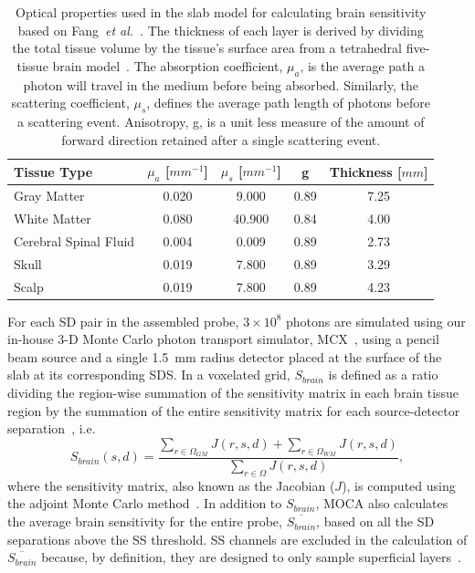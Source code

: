 \begin{table}
\centering
\caption{Optical properties used in the slab model for calculating brain sensitivity based on Fang~\emph{et al.}~\cite{Fang2010}. The thickness of each layer is derived by dividing the total tissue volume by the tissue's surface area from a tetrahedral five-tissue brain model~\cite{Sanchez2012}. The absorption coefficient, $\mu_{a}$, is the average path a photon will travel in the medium before being absorbed. Similarly, the scattering coefficient, $\mu_{s}$, defines the average path length of photons before a scattering event. Anisotropy, g, is a unit less measure of the amount of forward direction retained after a single scattering event.}
\label{tab:opticalproperties}
\begin{tabular}{@{}lcccc@{}}
\toprule
Tissue Type  & $\mu_{a}$ [$mm^{-1}$] & $\mu_{s}$ [$mm^{-1}$] & g    & Thickness [$mm$] \\ \midrule
Gray Matter                     & 0.020      & 9.000      & 0.89 & 7.25           \\
White Matter                    & 0.080      & 40.900     & 0.84 & 4.00           \\
Cerebral Spinal Fluid           & 0.004      & 0.009      & 0.89 & 2.73           \\
Skull                           & 0.019      & 7.800      & 0.89 & 3.29           \\
Scalp                           & 0.019      & 7.800      & 0.89 & 4.23           \\ \bottomrule
\end{tabular}
\end{table}

For each \ac{SD} pair in the assembled probe, $3\times10^{8}$ photons are simulated using our in-house 3-D Monte Carlo photon transport simulator, \ac{MCX}~\cite{Fang2009}, using a pencil beam source and a single 1.5~mm radius detector placed at the surface of the slab at its corresponding \ac{SDS}. In a voxelated grid, $S_{brain}$ is defined as a ratio dividing the region-wise summation of the sensitivity matrix in each brain tissue region by the summation of the entire sensitivity matrix for each source-detector separation~\cite{Brigadoi2015}, i.e.
\begin{equation}
\label{eq:fov}
S_{brain}(s,d) = \frac{\sum_{r\in\Omega_{GM}}J(r,s,d) + \sum_{r\in\Omega_{WM}}J(r,s,d)} {\sum_{r\in\Omega}J(r,s,d)},
\end{equation}
where the sensitivity matrix, also known as the Jacobian ($J$), is computed using the adjoint Monte Carlo method~\cite{Yao2018}. In addition to $S_{brain}$, \ac{MOCA} also calculates the average brain sensitivity for the entire probe, $\overline{S_{brain}}$, based on all the \ac{SD} separations above the \ac{SS} threshold. \ac{SS} channels are excluded in the calculation of $\overline{S_{brain}}$ because, by definition, they are designed to only sample superficial layers~\cite{Brigadoi2015}.

